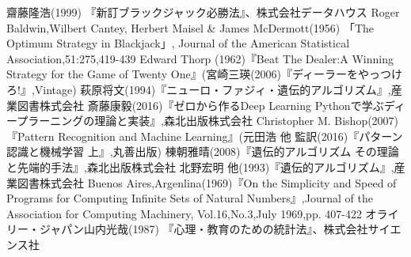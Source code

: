 \begin{thebibliography}{10}
   齋藤隆浩(1999) 『新訂ブラックジャック必勝法』、株式会社データハウス
   Roger Baldwin,Wilbert Cantey, Herbert Maisel \& James McDermott(1956) 「The Optimum Strategy in Blackjack」, Journal of the American Statistical Association,51:275,419-439
  Edward Thorp (1962)『Beat The Dealer:A Winning Strategy for the Game of Twenty One』(宮崎三瑛(2006)『ディーラーをやっつけろ!』,Vintage)
   萩原将文(1994)『ニューロ・ファジィ・遺伝的アルゴリズム』,産業図書株式会社
   斎藤康毅(2016)『ゼロから作るDeep Learning Pythonで学ぶディープラーニングの理論と実装』,森北出版株式会社
   Christopher M. Bishop(2007)『Pattern Recognition and Machine Learning』(元田浩 他 監訳(2016)『パターン認識と機械学習 上』,丸善出版)
   棟朝雅晴(2008)『遺伝的アルゴリズム その理論と先端的手法』,森北出版株式会社
   北野宏明 他(1993)『遺伝的アルゴリズム』,産業図書株式会社
   Buenos Aires,Argenlina(1969)『On the Simplicity and Speed of Programs for Computing Infinite Sets of Natural Numbers』,Journal of the Association for Computing Machinery, Vol.16,No.3,July 1969,pp. 407-422
   オライリー・ジャパン山内光哉(1987) 『心理・教育のための統計法』、株式会社サイエンス社
\end{thebibliography}